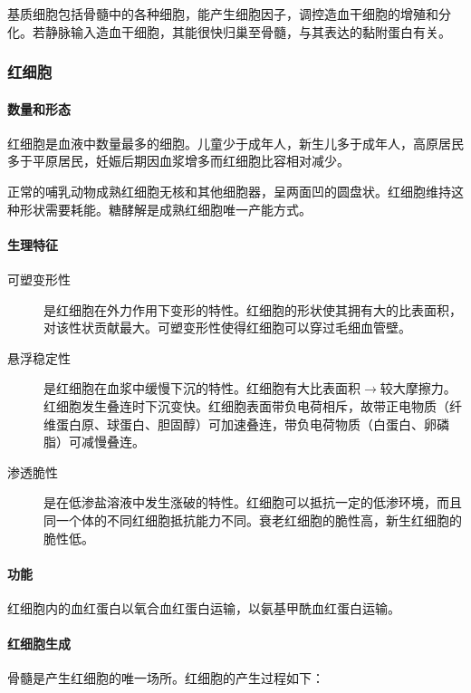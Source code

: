 基质细胞包括骨髓中的各种细胞，能产生细胞因子，调控造血干细胞的增殖和分化。若静脉输入造血干细胞，其能很快归巢至骨髓，与其表达的黏附蛋白有关。

\subsubsection{红细胞}

\paragraph{数量和形态}

红细胞是血液中数量最多的细胞。儿童少于成年人，新生儿多于成年人，高原居民多于平原居民，妊娠后期因血浆增多而红细胞比容相对减少。

正常的哺乳动物成熟红细胞无核和其他细胞器，呈两面凹的圆盘状。红细胞维持这种形状需要耗能。糖酵解是成熟红细胞唯一产能方式。

\paragraph{生理特征}

\begin{description}
	\item[可塑变形性] 是红细胞在外力作用下变形的特性。红细胞的形状使其拥有大的比表面积，对该性状贡献最大。可塑变形性使得红细胞可以穿过毛细血管壁。
	\item[悬浮稳定性] 是红细胞在血浆中缓慢下沉的特性。红细胞有大比表面积$\rightarrow$较大摩擦力。红细胞发生叠连时下沉变快。红细胞表面带负电荷相斥，故带正电物质（纤维蛋白原、球蛋白、胆固醇）可加速叠连，带负电荷物质（白蛋白、卵磷脂）可减慢叠连。
	\item[渗透脆性] 是在低渗盐溶液中发生涨破的特性。红细胞可以抵抗一定的低渗环境，而且同一个体的不同红细胞抵抗能力不同。衰老红细胞的脆性高，新生红细胞的脆性低。
\end{description}

\paragraph{功能}

红细胞内的血红蛋白以氧合血红蛋白运输，以氨基甲酰血红蛋白运输。

\paragraph{红细胞生成}

骨髓是产生红细胞的唯一场所。红细胞的产生过程如下：

